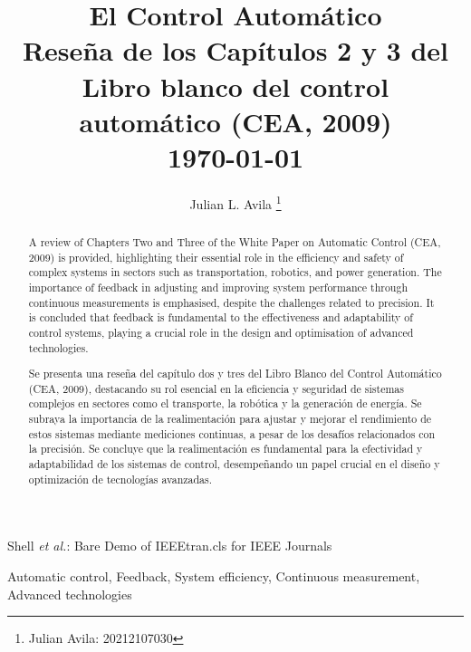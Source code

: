 \documentclass[journal, table]{IEEEtran}
\begin{document}
\title{\textbf{El Control Automático} \\
    \small{Reseña de los Capítulos 2 y 3 del Libro blanco del control automático
    (CEA, 2009) \cite{de-automatica-2009}} \\ \today}

\author[*]{Julian L. Avila
    \thanks{Julian Avila: 20212107030}}


\markboth{}
{Shell \MakeLowercase{\textit{et al.}}: Bare Demo of IEEEtran.cls for IEEE Journals}

\maketitle

\begin{abstract}
A review of Chapters Two and Three of the White Paper on Automatic Control
(CEA, 2009) is provided, highlighting their essential role in the efficiency
and safety of complex systems in sectors such as transportation, robotics,
and power generation.
The importance of feedback in adjusting and improving system performance
through continuous measurements is emphasised, despite the challenges related
to precision.
It is concluded that feedback is fundamental to the effectiveness and
adaptability of control systems, playing a crucial role in the design and
optimisation of advanced technologies.

\end{abstract}

\begin{IEEEkeywords}

Automatic control, Feedback, System efficiency, Continuous measurement,
Advanced technologies

\end{IEEEkeywords}

\begin{abstract}

Se presenta una reseña del capítulo dos y tres del Libro Blanco del Control
Automático (CEA, 2009), destacando su rol esencial en la eficiencia y seguridad
de sistemas complejos en sectores como el transporte, la robótica y la
generación de energía.
Se subraya la importancia de la realimentación para ajustar y mejorar el
rendimiento de estos sistemas mediante mediciones continuas, a pesar de los
desafíos relacionados con la precisión.
Se concluye que la realimentación es fundamental para la efectividad y
adaptabilidad de los sistemas de control, desempeñando un papel crucial en el
diseño y optimización de tecnologías avanzadas.

\end{abstract}
\end{document}

